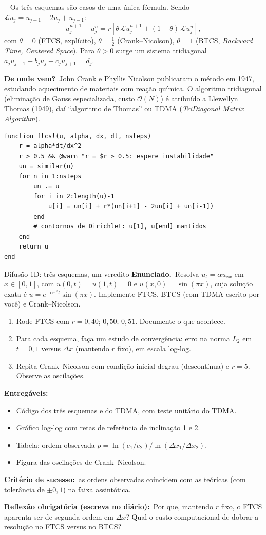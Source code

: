 \documentclass[10pt,a4paper,twocolumn,openany]{report}
\newcommand{\lead}[2]{\par\medskip\noindent{\color{#1}\bfseries #2}\ }
\newenvironment{dicionario}[1][Dicionário da equação]{\lead{azul}{#1.}\small}{\par\medskip}
\newcommand{\origem}{\par\smallskip\noindent\textcolor{azul}{\textbf{De onde vem?}}\ }
\newcommand{\enunciado}{\noindent\textbf{Enunciado.}\ }
\newcommand{\entregaveis}{\par\medskip\noindent\textbf{Entregáveis:}}
\newcommand{\criterio}{\par\medskip\noindent\textbf{Critério de sucesso:}\ }
\newcommand{\reflexao}{\par\medskip\noindent\textbf{Reflexão obrigatória (escreva no diário):}}
\begin{document}
\begin{dicionario}[Dicionário da equação: o método $\theta$]
Os três esquemas são casos de uma única fórmula. Sendo $\mathcal L u_j =
u_{j+1}-2u_j+u_{j-1}$:
\[
  u_j^{n+1}-u_j^n = r\left[\theta\,\mathcal L u_j^{n+1}+(1-\theta)\,\mathcal L u_j^{n}\right],
\]
com $\theta=0$ (FTCS, explícito), $\theta=\tfrac12$ (Crank--Nicolson),
$\theta=1$ (BTCS, \emph{Backward Time, Centered Space}). Para $\theta>0$
surge um sistema tridiagonal $a_ju_{j-1}+b_ju_j+c_ju_{j+1}=d_j$.
\origem John Crank e Phyllis Nicolson publicaram o método em 1947, estudando
aquecimento de materiais com reação química. O algoritmo tridiagonal
(eliminação de Gauss especializada, custo $\mathcal O(N)$) é atribuído a
Llewellyn Thomas (1949), daí ``algoritmo de Thomas'' ou TDMA
(\emph{TriDiagonal Matrix Algorithm}).
\end{dicionario}


\begin{lstlisting}[caption={Esqueleto FTCS em Julia (difusao 1D)}]
function ftcs!(u, alpha, dx, dt, nsteps)
    r = alpha*dt/dx^2
    r > 0.5 && @warn "r = $r > 0.5: espere instabilidade"
    un = similar(u)
    for n in 1:nsteps
        un .= u
        for i in 2:length(u)-1
            u[i] = un[i] + r*(un[i+1] - 2un[i] + un[i-1])
        end
        # contornos de Dirichlet: u[1], u[end] mantidos
    end
    return u
end
\end{lstlisting}

\begin{tarefa}{Difusão 1D: três esquemas, um veredito}
\enunciado Resolva $u_t=\alpha u_{xx}$ em $x\in[0,1]$, com $u(0,t)=u(1,t)=0$
e $u(x,0)=\sin(\pi x)$, cuja solução exata é $u=e^{-\alpha\pi^2 t}\sin(\pi x)$.
Implemente FTCS, BTCS (com TDMA escrito por você) e Crank--Nicolson.
\begin{enumerate}
  \item Rode FTCS com $r=0{,}40$; $0{,}50$; $0{,}51$. Documente o que acontece.
  \item Para cada esquema, faça um estudo de convergência: erro na norma $L_2$
        em $t=0{,}1$ versus $\Delta x$ (mantendo $r$ fixo), em escala log-log.
  \item Repita Crank--Nicolson com condição inicial degrau (descontínua) e
        $r=5$. Observe as oscilações.
\end{enumerate}
\entregaveis
\begin{itemize}
  \item Código dos três esquemas e do TDMA, com teste unitário do TDMA.
  \item Gráfico log-log com retas de referência de inclinação 1 e 2.
  \item Tabela: ordem observada $p = \ln(e_1/e_2)/\ln(\Delta x_1/\Delta x_2)$.
  \item Figura das oscilações de Crank--Nicolson.
\end{itemize}
\criterio as ordens observadas coincidem com as teóricas (com tolerância de
$\pm 0{,}1$) na faixa assintótica.
\reflexao\ Por que, mantendo $r$ fixo, o FTCS aparenta ser de segunda ordem
em $\Delta x$? Qual o custo computacional de dobrar a resolução no FTCS
versus no BTCS?
\end{tarefa}
\end{document}
